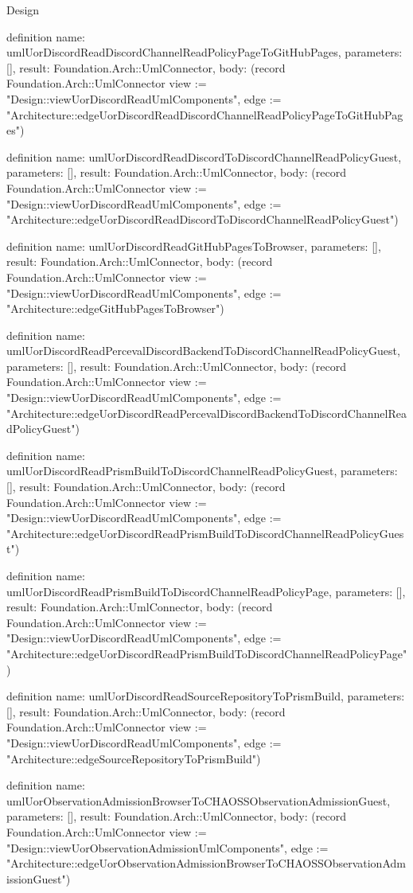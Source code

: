 \begin{lexlean}{Design}
\begin{semanticmodule}
definition{
  name: umlUorDiscordReadDiscordChannelReadPolicyPageToGitHubPages,
  parameters: [],
  result: Foundation.Arch::UmlConnector,
  body: (record Foundation.Arch::UmlConnector {view := "Design::viewUorDiscordReadUmlComponents", edge := "Architecture::edgeUorDiscordReadDiscordChannelReadPolicyPageToGitHubPages"})
}

definition{
  name: umlUorDiscordReadDiscordToDiscordChannelReadPolicyGuest,
  parameters: [],
  result: Foundation.Arch::UmlConnector,
  body: (record Foundation.Arch::UmlConnector {view := "Design::viewUorDiscordReadUmlComponents", edge := "Architecture::edgeUorDiscordReadDiscordToDiscordChannelReadPolicyGuest"})
}

definition{
  name: umlUorDiscordReadGitHubPagesToBrowser,
  parameters: [],
  result: Foundation.Arch::UmlConnector,
  body: (record Foundation.Arch::UmlConnector {view := "Design::viewUorDiscordReadUmlComponents", edge := "Architecture::edgeGitHubPagesToBrowser"})
}

definition{
  name: umlUorDiscordReadPercevalDiscordBackendToDiscordChannelReadPolicyGuest,
  parameters: [],
  result: Foundation.Arch::UmlConnector,
  body: (record Foundation.Arch::UmlConnector {view := "Design::viewUorDiscordReadUmlComponents", edge := "Architecture::edgeUorDiscordReadPercevalDiscordBackendToDiscordChannelReadPolicyGuest"})
}

definition{
  name: umlUorDiscordReadPrismBuildToDiscordChannelReadPolicyGuest,
  parameters: [],
  result: Foundation.Arch::UmlConnector,
  body: (record Foundation.Arch::UmlConnector {view := "Design::viewUorDiscordReadUmlComponents", edge := "Architecture::edgeUorDiscordReadPrismBuildToDiscordChannelReadPolicyGuest"})
}

definition{
  name: umlUorDiscordReadPrismBuildToDiscordChannelReadPolicyPage,
  parameters: [],
  result: Foundation.Arch::UmlConnector,
  body: (record Foundation.Arch::UmlConnector {view := "Design::viewUorDiscordReadUmlComponents", edge := "Architecture::edgeUorDiscordReadPrismBuildToDiscordChannelReadPolicyPage"})
}

definition{
  name: umlUorDiscordReadSourceRepositoryToPrismBuild,
  parameters: [],
  result: Foundation.Arch::UmlConnector,
  body: (record Foundation.Arch::UmlConnector {view := "Design::viewUorDiscordReadUmlComponents", edge := "Architecture::edgeSourceRepositoryToPrismBuild"})
}

definition{
  name: umlUorObservationAdmissionBrowserToCHAOSSObservationAdmissionGuest,
  parameters: [],
  result: Foundation.Arch::UmlConnector,
  body: (record Foundation.Arch::UmlConnector {view := "Design::viewUorObservationAdmissionUmlComponents", edge := "Architecture::edgeUorObservationAdmissionBrowserToCHAOSSObservationAdmissionGuest"})
}


\end{semanticmodule}
\end{lexlean}
